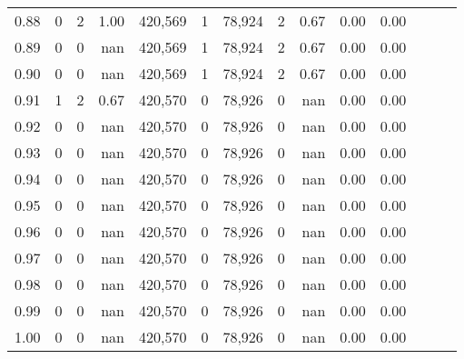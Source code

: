 \begin{tabular}{rrrrrrrrrrrrrr}
0.88 &       0 &      2 &  1.00 &  420,569 &        1 &  78,924 &       2 &  0.67 &  0.00 &      0.00 \\
0.89 &       0 &      0 &   nan &  420,569 &        1 &  78,924 &       2 &  0.67 &  0.00 &      0.00 \\
0.90 &       0 &      0 &   nan &  420,569 &        1 &  78,924 &       2 &  0.67 &  0.00 &      0.00 \\
0.91 &       1 &      2 &  0.67 &  420,570 &        0 &  78,926 &       0 &   nan &  0.00 &      0.00 \\
0.92 &       0 &      0 &   nan &  420,570 &        0 &  78,926 &       0 &   nan &  0.00 &      0.00 \\
0.93 &       0 &      0 &   nan &  420,570 &        0 &  78,926 &       0 &   nan &  0.00 &      0.00 \\
0.94 &       0 &      0 &   nan &  420,570 &        0 &  78,926 &       0 &   nan &  0.00 &      0.00 \\
0.95 &       0 &      0 &   nan &  420,570 &        0 &  78,926 &       0 &   nan &  0.00 &      0.00 \\
0.96 &       0 &      0 &   nan &  420,570 &        0 &  78,926 &       0 &   nan &  0.00 &      0.00 \\
0.97 &       0 &      0 &   nan &  420,570 &        0 &  78,926 &       0 &   nan &  0.00 &      0.00 \\
0.98 &       0 &      0 &   nan &  420,570 &        0 &  78,926 &       0 &   nan &  0.00 &      0.00 \\
0.99 &       0 &      0 &   nan &  420,570 &        0 &  78,926 &       0 &   nan &  0.00 &      0.00 \\
1.00 &       0 &      0 &   nan &  420,570 &        0 &  78,926 &       0 &   nan &  0.00 &      0.00 \\
\bottomrule
\end{tabular}
